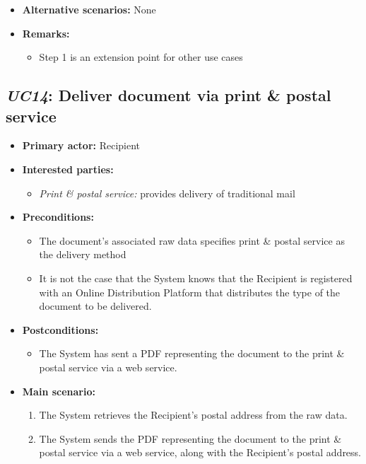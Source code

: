 \documentclass[a4paper,10pt]{article}
\begin{document}
\begin{itemize}
    \item \textbf{Alternative scenarios:} 
    None
    
    \item \textbf{Remarks:}
        \begin{itemize}
            \item Step 1 is an extension point for other use cases
        \end{itemize}
\end{itemize}

\subsection{\emph{UC14}: Deliver document via print \& postal service}
\begin{itemize}
    \item \textbf{Primary actor:} Recipient
    \item \textbf{Interested parties:} 
        \begin{itemize}
            \item \textit{Print \& postal service:} provides delivery of traditional mail
        \end{itemize}

    \item \textbf{Preconditions:}
        \begin{itemize}
            \item The document's associated raw data specifies print \& postal service as the delivery method
            \item It is not the case that the System knows that the Recipient is registered with an Online Distribution Platform that distributes the type of the document to be delivered.
        \end{itemize}

    \item \textbf{Postconditions:}
        \begin{itemize}
            \item The System has sent a PDF representing the document to the print \& postal service via a web service.
        \end{itemize}
        
    \item \textbf{Main scenario:} 
    \begin{enumerate}
       \item The System retrieves the Recipient's postal address from the raw data.
       \item The System sends the PDF representing the document to the print \& postal service via a web service, along with the Recipient's postal address.
    \end{enumerate}


\end{itemize}
\end{document}

